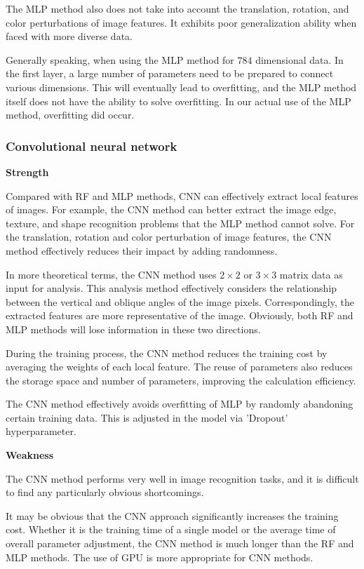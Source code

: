 The MLP method also does not take into account the translation, rotation, and color perturbations of image features. It exhibits poor generalization ability when faced with more diverse data.

Generally speaking, when using the MLP method for $784$ dimensional data. In the first layer, a large number of parameters need to be prepared to connect various dimensions. This will eventually lead to overfitting, and the MLP method itself does not have the ability to solve overfitting. In our actual use of the MLP method, overfitting did occur.

\subsubsection{Convolutional neural network}

\noindent\textbf{Strength}

Compared with RF and MLP methods, CNN can effectively extract local features of images. For example, the CNN method can better extract the image edge, texture, and shape recognition problems that the MLP method cannot solve. For the translation, rotation and color perturbation of image features, the CNN method effectively reduces their impact by adding randomness.

In more theoretical terms, the CNN method uses $2\times2$ or $3\times3$ matrix data as input for analysis. This analysis method effectively considers the relationship between the vertical and oblique angles of the image pixels. Correspondingly, the extracted features are more representative of the image. Obviously, both RF and MLP methods will lose information in these two directions.

During the training process, the CNN method reduces the training cost by averaging the weights of each local feature. The reuse of parameters also reduces the storage space and number of parameters, improving the calculation efficiency.

The CNN method effectively avoids overfitting of MLP by randomly abandoning certain training data. This is adjusted in the model via 'Dropout' hyperparameter.

\bigskip

\noindent\textbf{Weakness}

The CNN method performs very well in image recognition tasks, and it is difficult to find any particularly obvious shortcomings.

It may be obvious that the CNN approach significantly increases the training cost. Whether it is the training time of a single model or the average time of overall parameter adjustment, the CNN method is much longer than the RF and MLP methods. The use of GPU is more appropriate for CNN methods.

